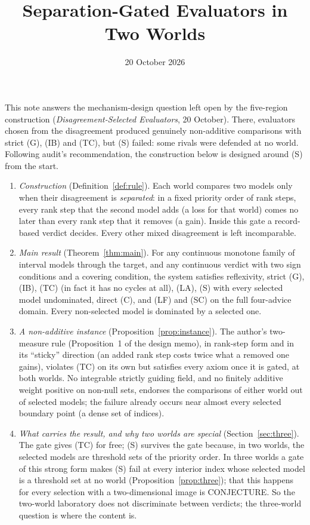 \documentclass[11pt]{article}
\title{Separation-Gated Evaluators in Two Worlds}
\author{}\date{20 October 2026}
\theoremstyle{definition}\newtheorem{definition}[theorem]{Definition}
\theoremstyle{remark}\newtheorem{remark}[theorem]{Remark}
\begin{document}
\maketitle

\noindent
This note answers the mechanism-design question left open by the five-region
construction (\emph{Disagreement-Selected Evaluators}, 20 October). There,
evaluators chosen from the disagreement produced genuinely non-additive
comparisons with strict (G), (IB) and (TC), but (S) failed: some rivals were
defended at no world. Following audit's recommendation, the construction below
is designed around (S) from the start.

\begin{enumerate}[leftmargin=*,itemsep=3pt]
\item \emph{Construction} (Definition~\ref{def:rule}). Each world compares two
models only when their disagreement is \emph{separated}: in a fixed priority
order of rank steps, every rank step that the second model adds (a loss for that
world) comes no later than every rank step that it removes (a gain). Inside this
gate a record-based verdict decides. Every other mixed disagreement is left
incomparable.
\item \emph{Main result} (Theorem~\ref{thm:main}). For any continuous monotone
family of interval models through the target, and any continuous verdict with
two sign conditions and a covering condition, the system satisfies reflexivity,
strict (G), (IB), (TC) (in fact it has no cycles at all), (LA), (S) with every
selected model undominated, direct (C), and (LF) and (SC) on the full
four-advice domain. Every non-selected model is dominated by a selected one.
\item \emph{A non-additive instance} (Proposition~\ref{prop:instance}). The
author's two-measure rule (Proposition~1 of the design memo), in rank-step form
and in its ``sticky'' direction (an added rank step costs twice what a removed
one gains), violates (TC) on its own but satisfies every axiom once it is gated,
at both worlds. No integrable strictly guiding field, and no finitely additive
weight positive on non-null sets, endorses the comparisons of either world out
of selected models; the failure already occurs near almost every selected
boundary point (a dense set of indices).
\item \emph{What carries the result, and why two worlds are special}
(Section~\ref{sec:three}). The gate gives (TC) for free; (S) survives the gate
because, in two worlds, the selected models are threshold sets of the priority
order. In three worlds a gate of this strong form makes (S) fail at every
interior index whose selected model is a threshold set at no world
(Proposition~\ref{prop:three}); that this happens for every selection with a
two-dimensional image is CONJECTURE. So the two-world laboratory does not
discriminate between verdicts; the three-world question is where the content is.
\end{enumerate}
\end{document}

